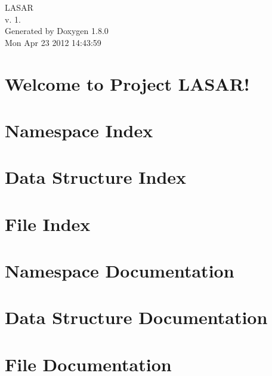 \documentclass{book}
\begin{document}
\hypersetup{pageanchor=false,citecolor=blue}
\begin{titlepage}
\vspace*{7cm}
\begin{center}
{\Large L\-A\-S\-A\-R \\[1ex]\large v. 1. }\\
\vspace*{1cm}
{\large Generated by Doxygen 1.8.0}\\
\vspace*{0.5cm}
{\small Mon Apr 23 2012 14:43:59}\\
\end{center}
\end{titlepage}
\clearemptydoublepage
{}
\tableofcontents
\clearemptydoublepage
{}
\hypersetup{pageanchor=true,citecolor=blue}
\chapter{Welcome to Project L\-A\-S\-A\-R!}
\label{index}\hypertarget{index}{}
\chapter{Namespace Index}

\chapter{Data Structure Index}

\chapter{File Index}

\chapter{Namespace Documentation}




\chapter{Data Structure Documentation}






\chapter{File Documentation}






\printindex
\end{document}
